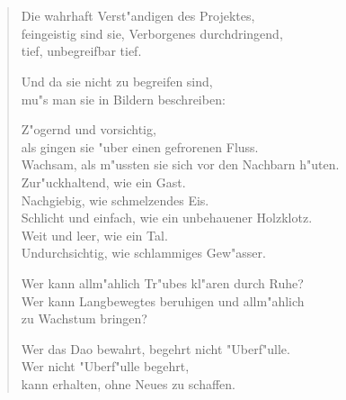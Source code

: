 \documentclass[a4paper,10pt,openany]{book}
\begin{document}
\chapter{}
\begin{verse}
    Die wahrhaft Verst"andigen des Projektes,\\
    feingeistig sind sie, Verborgenes durchdringend,\\
    tief, unbegreifbar tief.

    Und da sie nicht zu begreifen sind,\\
    mu"s man sie in Bildern beschreiben:

    Z"ogernd und vorsichtig,\\
    als gingen sie "uber einen gefrorenen Fluss.\\
    Wachsam, als m"ussten sie sich vor den Nachbarn h"uten.\\
    Zur"uckhaltend, wie ein Gast.\\
    Nachgiebig, wie schmelzendes Eis.\\
    Schlicht und einfach, wie ein unbehauener Holzklotz.\\
    Weit und leer, wie ein Tal.\\
    Undurchsichtig, wie schlammiges Gew"asser.

    Wer kann allm"ahlich Tr"ubes kl"aren durch Ruhe?\\
    Wer kann Langbewegtes beruhigen und allm"ahlich\\
    zu Wachstum bringen?

    Wer das Dao bewahrt, begehrt nicht "Uberf"ulle.\\
    Wer nicht "Uberf"ulle begehrt,\\
    kann erhalten, ohne Neues zu schaffen.
\end{verse}
\end{document}

